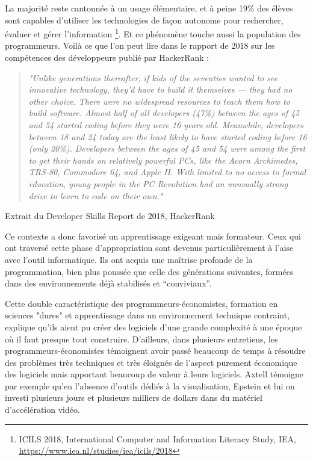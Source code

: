 La majorité reste cantonnée à un usage élémentaire, et à peine 19\% des élèves sont capables d’utiliser les technologies de façon autonome pour rechercher, évaluer et gérer l’information \footnote{ICILS 2018, International Computer and Information Literacy Study, IEA, \url{https://www.iea.nl/studies/iea/icils/2018}}. Et ce phénomène touche aussi la population des programmeurs. Voilà ce que l'on peut lire dans le rapport de 2018 sur les compétences des développeurs publié par HackerRank\cite{2018DeveloperSkills} :

\begin{quote}
\begin{center}
\textit{"Unlike generations thereafter, if kids of the seventies wanted to see innovative technology, they’d have to build it themselves — they had no other choice. There were no widespread resources to teach them how to build software. Almost half of all developers (47\%) between the ages of 45 and 54 started coding before they were 16 years old. Meanwhile, developers between 18 and 24 today are the least likely to have started coding before 16 (only 20\%).
Developers between the ages of 45 and 54 were among the first to get their hands on relatively powerful PCs, like the Acorn Archimedes, TRS-80, Commodore 64, and Apple II. With limited to no access to formal education, young people in the PC Revolution had an unusually strong drive to learn to code on their own."}
\end{center}
\end{quote} \hfill Extrait du Developer Skills Report de 2018, HackerRank\cite{2018DeveloperSkills}

Ce contexte a donc favorisé un apprentissage exigeant mais formateur. Ceux qui ont traversé cette phase d’appropriation sont devenus particulièrement à l’aise avec l’outil informatique. Ils ont acquis une maîtrise profonde de la programmation, bien plus poussée que celle des générations suivantes, formées dans des environnements déjà stabilisés et “conviviaux”.



Cette double caractéristique des programmeurs-économistes, formation en sciences "dures" et apprentissage dans un environnement technique contraint, explique qu'ils aient pu créer des logiciels d’une grande complexité à une époque où il faut presque tout construire. D'ailleurs, dans plusieurs entretiens, les programmeurs-économistes témoignent avoir passé beaucoup de temps à résoudre des problèmes très techniques et très éloignés de l'aspect purement économique des logiciels mais apportant beaucoup de valeur à leurs logiciels. Axtell témoigne par exemple qu'en l'absence d'outils dédiés à la visualisation, Epstein et lui on investi plusieurs jours et plusieurs milliers de dollars dans du matériel d'accélération vidéo. 

